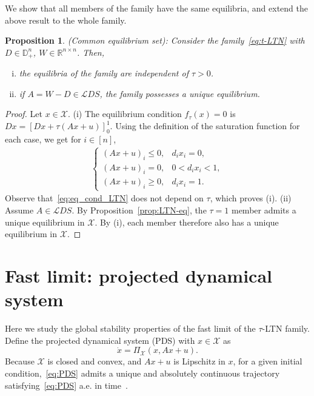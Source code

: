 \documentclass[letterpaper, conference]{ieeeconf}
\newcommand{\R}{\mathbb R}
\newcommand{\X}{\mathcal X}
\newtheorem{proposition}[theorem]{Proposition}
\newcommand{\longthmtitle}[1]{\mbox{}{\textit{(#1):}}}
\newcommand{\1}{\mathbf{1}}
\newcommand{\mc}{\mathcal}
\begin{document}
We show that all members of the family have the same equilibria, and extend the above result to the whole family.
\begin{proposition}\longthmtitle{Common equilibrium set}
\label{prop:common_equilibria}
Consider the family~\eqref{eq:t-LTN} with \(D \in \mathbb D_+^n\), \(W \in \R^{n\times n}\).
Then,
\begin{enumerate}[(i)]
    \item the equilibria of the family are independent of \(\tau>0\).
    \item if \(A = W - D \in \mc LDS\), the family possesses a unique equilibrium.
\end{enumerate}
\end{proposition}

\begin{proof}
Let \(x \in \X\). 
(i) The equilibrium condition \(f_\tau(x)=0\) is \(Dx=[Dx+\tau(Ax+u)]_0^1\).
Using the definition of the saturation function for each case,  we get for \(i \in [n]\),
\begin{align}\label{eq:eq_cond_LTN}
    \begin{cases}
    (Ax+u)_i \le 0, & d_ix_i=0,\\
    (Ax+u)_i = 0, & 0<d_i x_i<1,\\
    (Ax+u)_i \ge 0, & d_i x_i=1.
    \end{cases}    
\end{align}
Observe that~\eqref{eq:eq_cond_LTN} does not depend on \(\tau\), which proves (i).
(ii) Assume \(A \in \mc LDS\). 
By Proposition~\ref{prop:LTN-eq}, the \(\tau=1\) member admits a unique equilibrium in \(\X\).
By (i), each member therefore also has a unique equilibrium in \(\X\).
\end{proof}


\section{Fast limit: projected dynamical system}
Here we study the global stability properties of the fast limit of the $\tau$-LTN family.
Define the projected dynamical system (PDS) with \(x \in \X\) as
\begin{equation}\label{eq:PDS}\tag{PDS}
\dot x=\Pi_{\X}(x,Ax+u).
\end{equation}
Because \(\X\) is closed and convex, and \(Ax + u\) is Lipschitz in \(x\), for a given initial condition,~\eqref{eq:PDS} admits a unique and absolutely continuous trajectory satisfying~\eqref{eq:PDS} a.e. in time~\cite{AN-DZ:96}.
\end{document}
